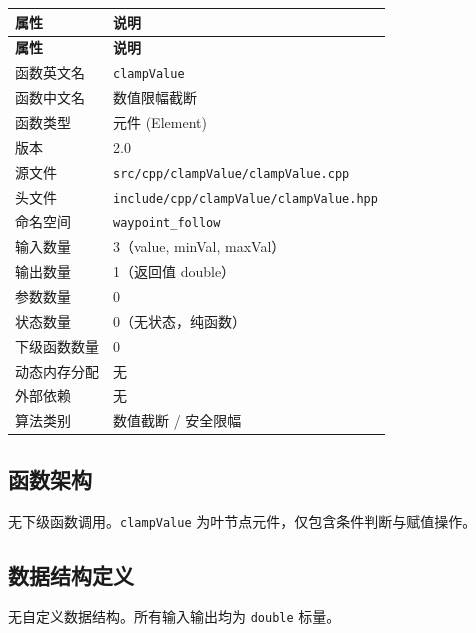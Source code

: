 \documentclass[a4paper,10pt]{article}
\begin{document}
\renewcommand{\arraystretch}{1.3}
\begin{longtable}{|L{3.8cm}|L{11.5cm}|}
\hline
\textbf{属性} & \textbf{说明} \\
\hline
\endfirsthead
\hline
\textbf{属性} & \textbf{说明} \\
\hline
\endhead
函数英文名 & \texttt{clampValue} \\
\hline
函数中文名 & 数值限幅截断 \\
\hline
函数类型 & 元件 (Element) \\
\hline
版本 & 2.0 \\
\hline
源文件 & \texttt{src/cpp/clampValue/clampValue.cpp} \\
\hline
头文件 & \texttt{include/cpp/clampValue/clampValue.hpp} \\
\hline
命名空间 & \texttt{waypoint\_follow} \\
\hline
输入数量 & 3（value, minVal, maxVal） \\
\hline
输出数量 & 1（返回值 double） \\
\hline
参数数量 & 0 \\
\hline
状态数量 & 0（无状态，纯函数） \\
\hline
下级函数数量 & 0 \\
\hline
动态内存分配 & 无 \\
\hline
外部依赖 & 无 \\
\hline
算法类别 & 数值截断 / 安全限幅 \\
\hline
\end{longtable}

\subsection{函数架构}

无下级函数调用。\texttt{clampValue} 为叶节点元件，仅包含条件判断与赋值操作。

\subsection{数据结构定义}

无自定义数据结构。所有输入输出均为 \texttt{double} 标量。

\end{document}

